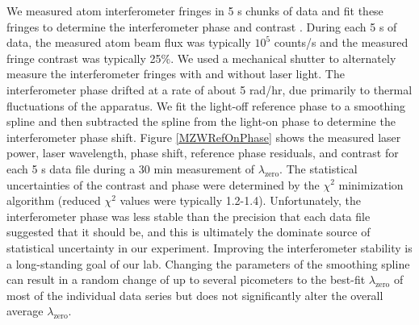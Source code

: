 We measured atom interferometer fringes in 5 s chunks of data and fit these fringes to determine the interferometer phase and contrast \cite{Ber97,Cro09}. During each 5 s of data, the measured atom beam flux was typically $10^5$ counts/s and the measured fringe contrast was typically 25\%. We used a mechanical shutter to alternately measure the interferometer fringes with and without laser light. The interferometer phase drifted at a rate of about 5 rad/hr, due primarily to thermal fluctuations of the apparatus. We fit the light-off reference phase to a smoothing spline and then subtracted the spline from the light-on phase to determine the interferometer phase shift. Figure \ref{MZWRefOnPhase} shows the measured laser power, laser wavelength, phase shift, reference phase residuals, and contrast for each 5 s data file during a 30 min measurement of $\lambda_\textrm{zero}$. The statistical uncertainties of the contrast and phase were determined by the $\chi^2$ minimization algorithm (reduced $\chi^2$ values were typically 1.2-1.4). Unfortunately, the interferometer phase was less stable than the precision that each data file suggested that it should be, and this is ultimately the dominate source of statistical uncertainty in our experiment. Improving the interferometer stability is a long-standing goal of our lab. Changing the parameters of the smoothing spline can result in a random change of up to several picometers to the best-fit $\lambda_\textrm{zero}$ of most of the individual data series but does not significantly alter the overall average $\lambda_\textrm{zero}$.


